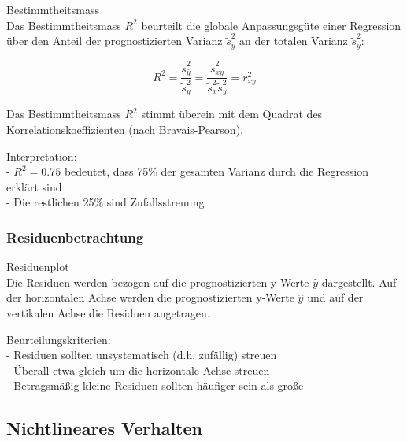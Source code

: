 \begin{theorem}{Bestimmtheitsmass}\\
Das Bestimmtheitsmass $R^2$ beurteilt die globale Anpassungsgüte einer Regression über den Anteil der prognostizierten Varianz $\tilde{s}_{\hat{y}}^2$ an der totalen Varianz $\tilde{s}_y^2$:

\[R^2 = \frac{\tilde{s}_{\hat{y}}^2}{\tilde{s}_y^2} = \frac{\tilde{s}_{xy}^2}{\tilde{s}_x^2\tilde{s}_y^2} = r_{xy}^2\]

Das Bestimmtheitsmass $R^2$ stimmt überein mit dem Quadrat des Korrelationskoeffizienten (nach Bravais-Pearson).

Interpretation:\\
- $R^2 = 0.75$ bedeutet, dass 75\% der gesamten Varianz durch die Regression erklärt sind\\
- Die restlichen 25\% sind Zufallsstreuung
\end{theorem}

\subsubsection{Residuenbetrachtung}

\begin{concept}{Residuenplot}\\
Die Residuen werden bezogen auf die prognostizierten y-Werte $\hat{y}$ dargestellt. Auf der horizontalen Achse werden die prognostizierten y-Werte $\hat{y}$ und auf der vertikalen Achse die Residuen angetragen.

Beurteilungskriterien:\\
- Residuen sollten unsystematisch (d.h. zufällig) streuen\\
- Überall etwa gleich um die horizontale Achse streuen\\
- Betragsmäßig kleine Residuen sollten häufiger sein als große
\end{concept}

\subsection{Nichtlineares Verhalten}

